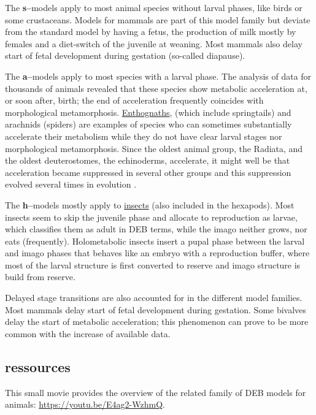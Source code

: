 The \textbf{s--}models apply to most animal species without larval phases, like birds or some crustaceans. 
Models for mammals are part of this model family but deviate from the standard model by having a fetus, the production of milk mostly by females and a diet-switch of the juvenile at weaning. 
Most mammals also delay start of fetal development during gestation (so-called diapause).

The \textbf{a--}models apply to most species with a larval phase. 
The analysis of data for thousands of animals revealed that these species show metabolic acceleration at, or soon after, birth; 
the end of acceleration frequently coincides with morphological metamorphosis.
\href{https://en.wikipedia.org/wiki/Entognatha}{Enthognaths}, (which include springtails) and arachnids (spiders) are examples of species who can sometimes substantially accelerate their metabolism while they do not have clear larval stages nor morphological metamorphosis.
Since the oldest animal group, the Radiata, and the oldest deuterostomes, the echinoderms, accelerate, it might well be that acceleration became  suppressed in several other groups and this suppression evolved several times in evolution \cite{Kooy2014}. 



The \textbf{h--}models mostly apply to \href{https://en.wikipedia.org/wiki/Insect}{insects} (also included in the hexapods). Most insects seem to skip the juvenile phase and allocate to reproduction as larvae, which classifies them as adult in DEB terms, while the imago neither grows, nor eats (frequently).
Holometabolic insects insert a pupal phase between the larval and imago phases that behaves like an embryo with a reproduction buffer, where most of the larval structure is first converted to reserve \cite{LlanMarq2015} and imago structure is build from reserve.

Delayed stage transitions are also accounted for in the different model families. 
Most mammals delay start of fetal development during gestation. 
Some bivalves delay the start of metabolic acceleration; 
this phenomenon can prove to be more common with the increase of available data.

\subsection{ressources}

This small movie provides the overview of the related family of DEB models for animals: \url{https://youtu.be/E4ag2-WzhmQ}.